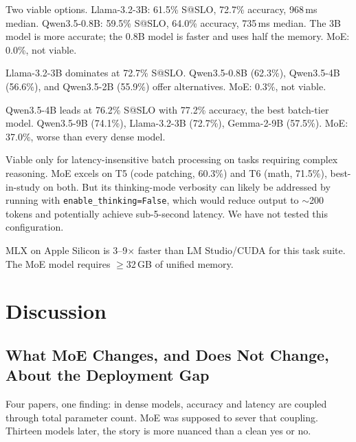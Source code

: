 \documentclass[11pt]{article}
\begin{document}
\begin{description}[leftmargin=12pt]
    \item[For Interactive SLOs ($\leq$2s):] Two viable options.  Llama-3.2-3B: 61.5\% S@SLO, 72.7\% accuracy, 968\,ms median.  Qwen3.5-0.8B: 59.5\% S@SLO, 64.0\% accuracy, 735\,ms median.  The 3B model is more accurate; the 0.8B model is faster and uses half the memory.  MoE: 0.0\%, not viable.

    \item[For Standard SLOs ($\leq$5s):] Llama-3.2-3B dominates at 72.7\% S@SLO.  Qwen3.5-0.8B (62.3\%), Qwen3.5-4B (56.6\%), and Qwen3.5-2B (55.9\%) offer alternatives.  MoE: 0.3\%, not viable.

    \item[For Batch SLOs ($\leq$30s):] Qwen3.5-4B leads at 76.2\% S@SLO with 77.2\% accuracy, the best batch-tier model.  Qwen3.5-9B (74.1\%), Llama-3.2-3B (72.7\%), Gemma-2-9B (57.5\%).  MoE: 37.0\%, worse than every dense model.

    \item[For MoE specifically:] Viable only for latency-insensitive batch processing on tasks requiring complex reasoning.  MoE excels on T5 (code patching, 60.3\%) and T6 (math, 71.5\%), best-in-study on both.  But its thinking-mode verbosity can likely be addressed by running with \texttt{enable\_thinking=False}, which would reduce output to ${\sim}$200 tokens and potentially achieve sub-5-second latency.  We have not tested this configuration.

    \item[Hardware:] MLX on Apple Silicon is 3--9$\times$ faster than LM Studio/CUDA for this task suite.  The MoE model requires $\geq$32\,GB of unified memory.
\end{description}


\section{Discussion}
\label{sec:discussion}

\subsection{What MoE Changes, and Does Not Change, About the Deployment Gap}

Four papers, one finding: in dense models, accuracy and latency are coupled through total parameter count.  MoE was supposed to sever that coupling.  Thirteen models later, the story is more nuanced than a clean yes or no.
\end{document}
